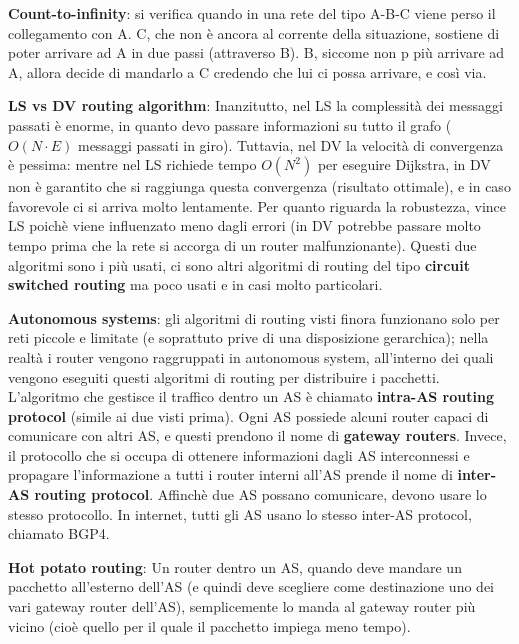 \documentclass[a4paper,10pt]{article} %
\renewcommand{\b}[1]{%
    {\textbf{#1}}}
\begin{document}
\b{Count-to-infinity}: si verifica quando in una rete del tipo A-B-C viene perso il collegamento con A. C, che non è ancora al corrente della situazione, sostiene di poter arrivare ad A in due passi (attraverso B). B, siccome non p più arrivare ad A, allora decide di mandarlo a C credendo che lui ci possa arrivare, e così via.

\b{LS vs DV routing algorithm}: Inanzitutto, nel LS la complessità dei messaggi passati è enorme, in quanto devo passare informazioni su tutto il grafo ($O(N \cdot E)$ messaggi passati in giro). Tuttavia, nel DV la velocità di convergenza è pessima: mentre nel LS richiede tempo $O(N^2)$ per eseguire Dijkstra, in DV non è garantito che si raggiunga questa convergenza (risultato ottimale), e in caso favorevole ci si arriva molto lentamente. Per quanto riguarda la robustezza, vince LS poichè viene influenzato meno dagli errori (in DV potrebbe passare molto tempo prima che la rete si accorga di un router malfunzionante). Questi due algoritmi sono i più usati, ci sono altri algoritmi di routing del tipo \b{circuit switched routing} ma poco usati e in casi molto particolari.

\b{Autonomous systems}: gli algoritmi di routing visti finora funzionano solo per reti piccole e limitate (e soprattuto prive di una disposizione gerarchica); nella realtà i router vengono raggruppati in autonomous system, all'interno dei quali vengono eseguiti questi algoritmi di routing per distribuire i pacchetti. L'algoritmo che gestisce il traffico dentro un AS è chiamato \b{intra-AS routing protocol} (simile ai due visti prima). Ogni AS possiede alcuni router capaci di comunicare con altri AS, e questi prendono il nome di \b{gateway routers}. Invece, il protocollo che si occupa di ottenere informazioni dagli AS interconnessi e propagare l'informazione a tutti i router interni all'AS prende il nome di \b{inter-AS routing protocol}. Affinchè due AS possano comunicare, devono usare lo stesso protocollo. In internet, tutti gli AS usano lo stesso inter-AS protocol, chiamato BGP4.

\b{Hot potato routing}: Un router dentro un AS, quando deve mandare un pacchetto all'esterno dell'AS (e quindi deve scegliere come destinazione uno dei vari gateway router dell'AS), semplicemente lo manda al gateway router più vicino (cioè quello per il quale il pacchetto impiega meno tempo).
\end{document}
